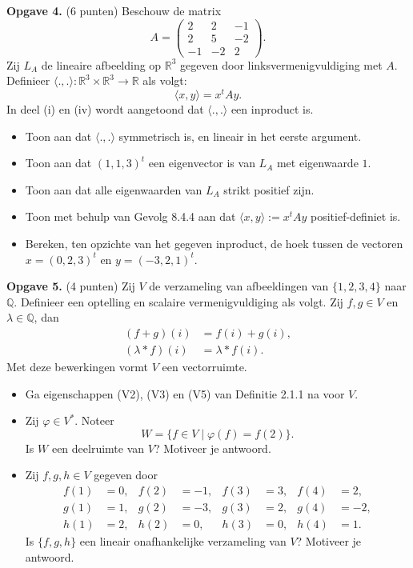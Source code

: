 \documentclass[a4paper,12pt]{article}
\begin{document}
\begin{enumerate}
\textbf{Opgave 4.} (6 punten) Beschouw de matrix
\[
A = \begin{pmatrix}
2 & 2 & -1 \\
2 & 5 & -2 \\
-1 & -2 & 2
\end{pmatrix}.
\]
Zij $L_A$ de lineaire afbeelding op $\mathbb{R}^3$ gegeven door linksvermenigvuldiging met $A$. Definieer $\langle ., . \rangle : \mathbb{R}^3 \times \mathbb{R}^3 \to \mathbb{R}$ als volgt:
\[
\langle x, y \rangle = x^t A y.
\]
In deel (i) en (iv) wordt aangetoond dat $\langle ., . \rangle$ een inproduct is.
\begin{itemize}
    \item[(i)] Toon aan dat $\langle ., . \rangle$ symmetrisch is, en lineair in het eerste argument.
    \item[(ii)] Toon aan dat $(1, 1, 3)^t$ een eigenvector is van $L_A$ met eigenwaarde $1$.
    \item[(iii)] Toon aan dat alle eigenwaarden van $L_A$ strikt positief zijn.
    \item[(iv)] Toon met behulp van Gevolg 8.4.4 aan dat $\langle x, y \rangle := x^t A y$ positief-definiet is.
    \item[(v)] Bereken, ten opzichte van het gegeven inproduct, de hoek tussen de vectoren $x = (0, 2, 3)^t$ en $y = (-3, 2, 1)^t$.
\end{itemize}

\vspace{0.5cm}

\textbf{Opgave 5.} (4 punten) Zij $V$ de verzameling van afbeeldingen van $\{1, 2, 3, 4\}$ naar $\mathbb{Q}$. Definieer een optelling en scalaire vermenigvuldiging als volgt. Zij $f, g \in V$ en $\lambda \in \mathbb{Q}$, dan
\begin{align*}
(f + g)(i) &= f(i) + g(i), \\
(\lambda * f)(i) &= \lambda * f(i).
\end{align*}
Met deze bewerkingen vormt $V$ een vectorruimte.
\begin{itemize}
    \item[(i)] Ga eigenschappen (V2), (V3) en (V5) van Definitie 2.1.1 na voor $V$.
    \item[(ii)] Zij $\varphi \in V^\ast$. Noteer
    \[
    W = \{f \in V \mid \varphi(f) = f(2)\}.
    \]
    Is $W$ een deelruimte van $V$? Motiveer je antwoord.
    \item[(iii)] Zij $f, g, h \in V$ gegeven door
    \begin{align*}
    f(1) &= 0, & f(2) &= -1, & f(3) &= 3, & f(4) &= 2, \\
    g(1) &= 1, & g(2) &= -3, & g(3) &= 2, & g(4) &= -2, \\
    h(1) &= 2, & h(2) &= 0, & h(3) &= 0, & h(4) &= 1.
    \end{align*}
    Is $\{f, g, h\}$ een lineair onafhankelijke verzameling van $V$? Motiveer je antwoord.
\end{itemize}




\end{enumerate}
\end{document}
